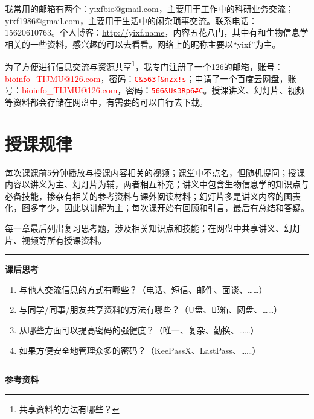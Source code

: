 \documentclass[11pt,a4paper,twoside]{book}
\begin{document}
我常用的邮箱有两个：\href{mailto:yixfbio@gmail.com}{yixfbio@gmail.com}，主要用于工作中的科研业务交流；\href{mailto:yixf1986@gmail.com}{yixf1986@gmail.com}，主要用于生活中的闲杂琐事交流。联系电话：15620610763。个人博客：\href{http://yixf.name}{http://yixf.name}，内容五花八门，其中有和生物信息学相关的一些资料，感兴趣的可以去看看。网络上的昵称主要以“yixf”为主。

为了方便进行信息交流与资源共享\footnote{共享资料的方法有哪些？}，我专门注册了一个126的邮箱，账号：\textcolor{red}{bioinfo\_TIJMU@126.com}，密码：\textcolor{red}{\texttt{C\&563f\&nzx!s}}；申请了一个百度云网盘，账号：\textcolor{red}{bioinfo\_TIJMU@126.com}，密码：\textcolor{red}{\texttt{566\&Us3Rp6\#C}}。授课讲义、幻灯片、视频等资料都会存储在网盘中，有需要的可以自行去下载。

\section{授课规律}
每次课课前5分钟播放与授课内容相关的视频；课堂中不点名，但随机提问；授课内容以讲义为主、幻灯片为辅，两者相互补充；讲义中包含生物信息学的知识点与必备技能，掺杂有相关的参考资料与课外阅读材料；幻灯片多是讲义内容的图表化，图多字少，因此以讲解为主；每次课开始有回顾和引言，最后有总结和答疑。

每一章最后列出复习思考题，涉及相关知识点和技能；在网盘中共享讲义、幻灯片、视频等所有授课资料。

\vspace{1cm}
\hrule height 3pt

\noindent
{\Large \bfseries \Coffeecup 课后思考}
\begin{enumerate}
  \item 与他人交流信息的方式有哪些？（电话、短信、邮件、面谈、……）
  \item 与同学/同事/朋友共享资料的方法有哪些？（U盘、邮箱、网盘、……）
  \item 从哪些方面可以提高密码的强健度？（唯一、复杂、勤换、……）
  \item 如果方便安全地管理众多的密码？（KeePassX、LastPass、……）
\end{enumerate}

\vspace{1cm}
\hrule height 3pt

\noindent
{\Large \bfseries \HandPencilLeft 参考资料}
\end{document}
